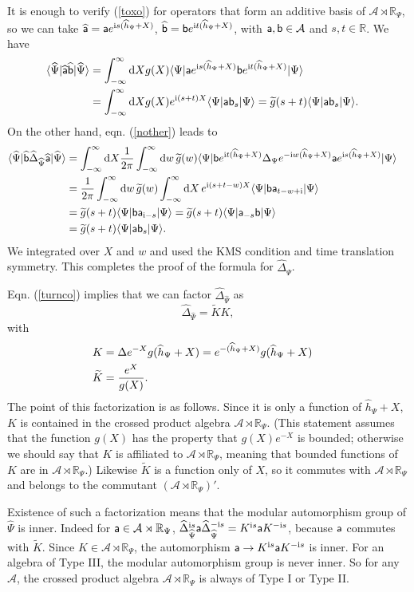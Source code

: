 \documentclass[11pt,a4paper]{article}
\def\t{{ \sf t}}
\def\a{{\sf a}}
\def\b{{\sf b}}
\def\i{{\mathrm i}}
\def\be{\begin{equation}}
\def\ee{\end{equation}}
\def\tilde{\widetilde}
\def\h{\widehat}
\def\A{{\mathcal A}}
\def\d{{\mathrm d}}
\def\R{{\mathbb R}}
\def\t{\widetilde }
\def\h{\widehat}
\def\la{\langle}
\def\ra{\rangle}
\def\tilde{\widetilde}
\begin{document}
It is enough to verify (\ref{toxo})  for operators that form an additive basis of $\A\rtimes \R_\Psi$, so we can take $\h\a=\a e^{\i s(\h h_\Psi+X)}$,
$\h \b =\b e^{\i t(\h h_\Psi+X)}$, with $\a,\b\in\A$ and $s,t\in\R$.  
We have
\begin{align} \label{zzz}\la\h\Psi|\h \a\h \b|\h\Psi\ra&=\int_{-\infty}^\infty \d X g(X) \la\Psi|\a e^{\i s(\h h_\Psi+X)} \b e^{\i t(\h h_\Psi+X)}|\Psi\ra
\cr &=\int_{-\infty}^\infty \d X g(X) e^{\i(s+t)X} \la\Psi|\a \b_s|\Psi\ra =\t g(s+t)  \la\Psi|\a \b_s|\Psi\ra.\end{align}
On the other hand, eqn. (\ref{nother}) leads to 
\begin{align}\label{ohmy}\la\h\Psi|\h\b \h\Delta_{\h\Psi}\h \a|\h\Psi\ra&=\int_{-\infty}^\infty \d X \frac{1}{2\pi}\int_{-\infty}^\infty \d w \,\t g(w)\la\Psi |
\b e^{\i t(\h h_\Psi+X) }\Delta_\Psi e^{-\i w(\h h_\Psi+X)}\a e^{\i s(\h h_\Psi+X)}|\Psi\ra\cr&
=\frac{1}{2\pi}\int_{-\infty}^\infty \d w\,\t g(w) \int_{-\infty}^\infty \d X \,e^{\i(s+t-w)X}\la\Psi|\b \a_{t-w+\i} |\Psi\ra\cr
&=\t g(s+t)\la\Psi|\b\a_{\i-s}|\Psi\ra=\t g(s+t)\la\Psi|\a_{-s}\b|\Psi\ra\cr&=\t g(s+t)\la\Psi|\a\b_s|\Psi\ra. \end{align}
We integrated over $X$ and $w$ and used the KMS condition and time translation symmetry.  This completes the proof of the formula for
$\h\Delta_{\h\Psi}$.

Eqn. (\ref{turnco}) implies  that we can factor $\h\Delta_{\h\Psi}$ as
\be\label{arno}\h \Delta_{\h\Psi}=\t K K, \ee with
\begin{align}\label{narno}  K&= \Delta e^{-X} g(\h h_\Psi+X)=e^{-(\h h_\Psi+X)} g(\h h_\Psi+X) \cr
     \t K& =\frac{e^{X}}{ g(X)}. \end{align}
     The point of this factorization is as follows.
  Since it is only a function of $\h h_\Psi+X$, $K$ is contained in the crossed product algebra $\A\rtimes \R_\Psi$.
  (This statement assumes that the function $g(X)$ has the property that $g(X) e^{-X}$ is bounded; otherwise we should say
  that $K$ is affiliated to $\A\rtimes \R_\Psi$, meaning that bounded functions of $K$ are in $\A\rtimes\R_\Psi$.)   Likewise
  $\t K$ is a function only of $X$, so it commutes with $\A\rtimes\R_\Psi$ and belongs to the commutant $(\A\rtimes \R_\Psi)'$.   
  
  Existence of such a  factorization means that the modular automorphism group of $\h\Psi$ is inner.  Indeed for $\a\in\A\rtimes \R_\Psi$,  $\h\Delta_{\h\Psi}^{\i s}\a
  \h\Delta_{\h\Psi}^{-\i s}=K^{\i s}\a K^{-\i s}$, because $\a$ commutes with $\tilde K$. Since $K\in \A\rtimes \R_\Psi$, the automorphism $\a\to K^{\i s}\a K^{-\i s}$ is inner.
For an algebra of Type III, the modular automorphism group is never inner.   So for any $\A$, the crossed product algebra $\A\rtimes \R_\Psi$ is always
of Type I or Type II.    
\end{document}
